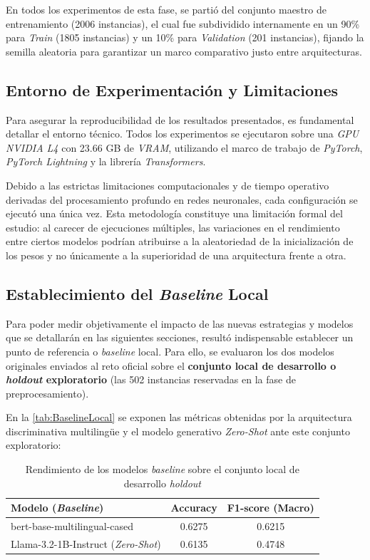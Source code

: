 En todos los experimentos de esta fase, se partió del conjunto maestro de entrenamiento (2006 instancias), el cual fue subdividido internamente en un 90\% para \textit{Train} (1805 instancias) y un 10\% para \textit{Validation} (201 instancias), fijando la semilla aleatoria para garantizar un marco comparativo justo entre arquitecturas. 

\subsection*{Entorno de Experimentación y Limitaciones}
Para asegurar la reproducibilidad de los resultados presentados, es fundamental detallar el entorno técnico. Todos los experimentos se ejecutaron sobre una \textit{GPU NVIDIA L4} con 23.66 GB de \textit{VRAM}, utilizando el marco de trabajo de \textit{PyTorch}, \textit{PyTorch Lightning} y la librería \textit{Transformers}.

Debido a las estrictas limitaciones computacionales y de tiempo operativo derivadas del procesamiento profundo en redes neuronales, cada configuración se ejecutó una única vez. Esta metodología constituye una limitación formal del estudio: al carecer de ejecuciones múltiples, las variaciones en el rendimiento entre ciertos modelos podrían atribuirse a la aleatoriedad de la inicialización de los pesos y no únicamente a la superioridad de una arquitectura frente a otra. 

\subsection*{Establecimiento del \textit{Baseline} Local}
Para poder medir objetivamente el impacto de las nuevas estrategias y modelos que se detallarán en las siguientes secciones, resultó indispensable establecer un punto de referencia o \textit{baseline} local. Para ello, se evaluaron los dos modelos originales enviados al reto oficial sobre el \textbf{conjunto local de desarrollo o \textit{holdout} exploratorio} (las 502 instancias reservadas en la fase de preprocesamiento).


En la \autoref{tab:BaselineLocal} se exponen las métricas obtenidas por la arquitectura discriminativa multilingüe y el modelo generativo \textit{Zero-Shot} ante este conjunto exploratorio:

\begin{table}[H]
    \centering
    \begin{tabular}{lcc}
        \toprule
        \textbf{Modelo (\textit{Baseline})} & \textbf{Accuracy} & \textbf{F1-score (Macro)} \\
        \midrule
        bert-base-multilingual-cased & 0.6275 & 0.6215 \\
        Llama-3.2-1B-Instruct (\textit{Zero-Shot}) & 0.6135 & 0.4748 \\
        \bottomrule
    \end{tabular}
    \caption{Rendimiento de los modelos \textit{baseline} sobre el conjunto local de desarrollo \textit{holdout}}
    \label{tab:BaselineLocal}
\end{table}

